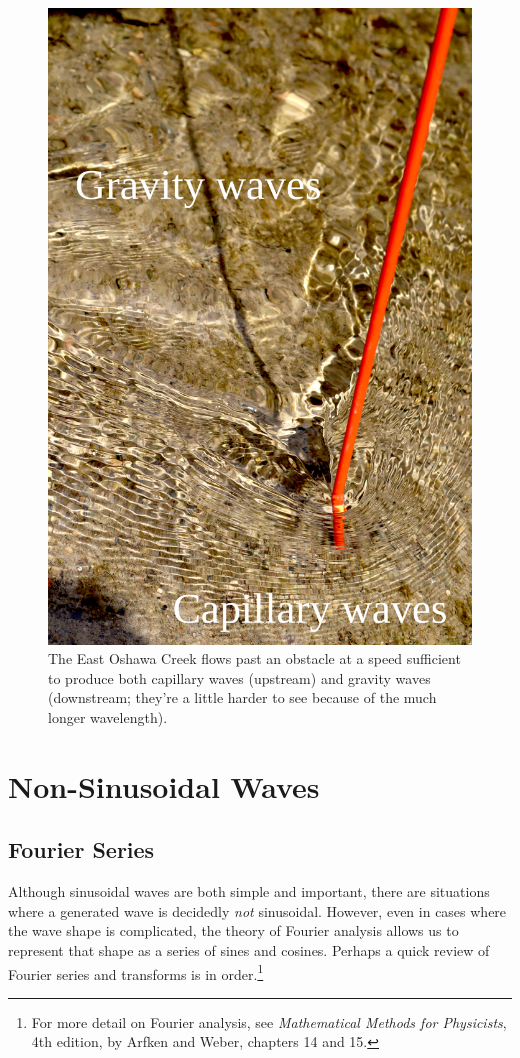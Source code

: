 \begin{figure}
\centering\includegraphics[width=0.6\linewidth]{Figures/Chapter5/fig_stream_obstacle}
\caption{The East Oshawa Creek flows past an obstacle at a speed sufficient to produce both capillary waves (upstream) and gravity waves (downstream; they're a little harder to see because of the much longer wavelength).}
\label{fig_stream_obstacle}
\end{figure}


%
%

\section{Non-Sinusoidal Waves}


\subsection{Fourier Series}

Although sinusoidal waves are both simple and important, there are situations where a generated wave is decidedly \emph{not} sinusoidal.  However, even in cases where the wave shape is complicated, the theory of Fourier analysis allows us to represent that shape as a series of sines and cosines.  Perhaps a quick review of Fourier series and transforms is in order.\footnote{For more detail on Fourier analysis, see \emph{Mathematical Methods for Physicists}, 4th edition, by Arfken  and Weber, chapters 14 and 15.}

